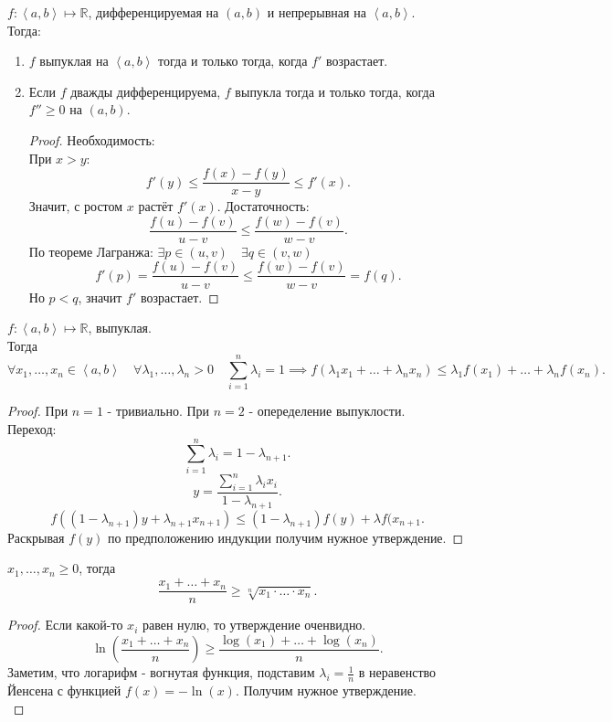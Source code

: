 \documentclass[11pt, oneside]{article}   	%
\begin{document}
\begin{theorem}
    $f : \left<a, b\right> \mapsto \mathbb{R}$, дифференцируемая на $\left( a, b \right) $ и непрерывная на $\left<a, b\right>$.\\
    Тогда:
    \begin{enumerate}
        \item $f$ выпуклая на $\left<a, b\right>$ тогда и только тогда, когда $f'$ возрастает.
        \item Если $f$ дважды дифференцируема, $f$ выпукла тогда и только тогда, когда $f'' \ge 0$ на $\left( a, b \right)$.
        \begin{proof}
            Необходимость:\\
            При $x>y$:
            \[ f'(y) \le \frac{f(x)-f(y)}{x-y} \le f'(x) .\]
            Значит, с ростом $x$ растёт $f'(x)$.
            Достаточность:
            \[ \frac{f(u)-f(v)}{u-v} \le \frac{f(w)-f(v)}{w-v} .\]
            По теореме Лагранжа: $\exists{p\in (u, v)}\quad \exists{q\in (v, w)}\quad $
            \[ f'(p) = \frac{f(u)-f(v)}{u-v} \le \frac{f(w)-f(v)}{w-v} = f(q) .\]
            Но $p<q$, значит $f'$ возрастает. 
        \end{proof}
    \end{enumerate}
\end{theorem}
\begin{theorem}
    $f : \left<a, b\right> \mapsto \mathbb{R}$, выпуклая.\\
    Тогда
    \[ \forall{x_1, \ldots, x_n\in \left<a, b\right>}\quad \forall{\lambda_1, \ldots, \lambda_n >0}\quad \sum\limits_{i=1}^{n}\lambda_i = 1 \implies f(\lambda_1x_1 + \ldots + \lambda_nx_n) \le \lambda_1 f(x_1) + \ldots + \lambda_{n}f(x_n) .\]
    \begin{proof}
        При $n=1$ - тривиально.
        При $n=2$ - опеределение выпуклости.\\
        Переход:
        \[ \sum\limits_{i=1}^{n}\lambda_{i} = 1 - \lambda_{n+1} .\]
        \[ y = \frac{\sum\limits_{i=1}^{n}\lambda_i x_i}{1-\lambda_{n+1}} .\] 
        \[ f((1-\lambda_{n+1})y+\lambda_{n+1}x_{n+1}) \le (1-\lambda_{n+1})f(y) + \lambda f(x_{n+1}.\]
        Раскрывая $f(y)$ по предположению индукции получим нужное утверждение.
    \end{proof}
\end{theorem}
\begin{theorem}
    $x_1, \ldots, x_n \ge 0$, тогда
    \[ \frac{x_1 + \ldots + x_{n}}{n} \ge \sqrt[n]{x_1 \cdot \ldots \cdot  x_n}  .\]
    \begin{proof}
        Если какой-то $x_i$ равен нулю, то утверждение оченвидно.\\
        \[ \ln \left( \frac{x_1 + \ldots + x_n}{n} \right) \ge \frac{\log(x_1) + \ldots + \log(x_n)}{n}  .\]
        Заметим, что логарифм - вогнутая функция, подставим $\lambda_i = \frac{1}{n}$ в неравенство Йенсена с функцией $f(x) = -\ln(x)$. Получим нужное утверждение.\\
    \end{proof}
\end{theorem}
\end{document}
